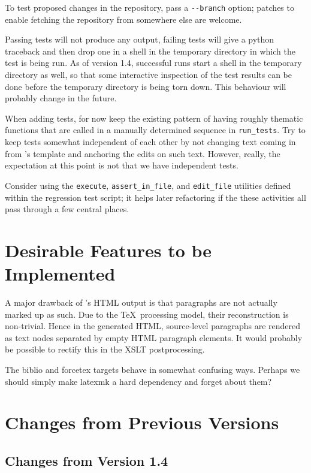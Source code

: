 \documentclass[11pt,a4paper]{ivoa}
\begin{document}
To test proposed changes in the \ivoatex repository, pass a
\verb|--branch| option; patches to enable fetching the repository from
somewhere else are welcome.

Passing tests will not produce any output, failing tests will give a
python traceback and then drop one in a shell in the temporary directory
in which the test is being run.  As of version 1.4, successful runs
start a shell in the temporary directory as well, so that some
interactive inspection of the test results can be done before the
temporary directory is being torn down.  This behaviour will probably
change in the future.

When adding tests, for now keep the existing pattern of having roughly
thematic functions that are called in a manually determined sequence in
\verb|run_tests|.  Try to keep tests somewhat independent of each other by
not changing text coming in from \ivoatex's template and anchoring the
edits on such text.  However, really, the expectation at this point is
not that we have independent tests.

Consider using the \verb|execute|, \verb|assert_in_file|, and
\verb|edit_file| utilities defined within the regression test script; it
helps later refactoring if the these activities all pass through a few
central places.

\section{Desirable Features to be Implemented}

A major drawback of \ivoatex's HTML output is that paragraphs are not actually
marked up as such.  Due to the \TeX\ processing model, their
reconstruction is non-trivial.  Hence in the generated HTML,
source-level paragraphs are rendered as text nodes separated by empty
HTML paragraph elements.  It would probably be possible to rectify this
in the XSLT postprocessing.

The biblio and forcetex targets behave in somewhat confusing ways.
Perhaps we should simply make latexmk a hard dependency and forget about
them?

\appendix
\section{Changes from Previous Versions}

\subsection{Changes from Version 1.4}
\end{document}
